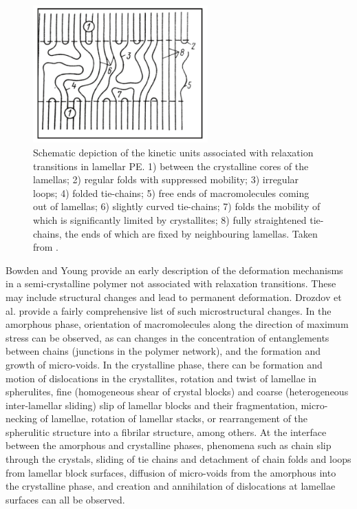 \begin{figure}[hbtp]
	\centering
	\includegraphics[width=0.6\textwidth]{figures/kinetic_units_scp}
	\caption{Schematic depiction of the kinetic units associated with relaxation transitions in lamellar PE. 1) between the crystalline cores of the lamellas; 2) regular folds with suppressed mobility; 3) irregular loops; 4) folded tie-chains; 5) free ends of macromolecules coming out of lamellas; 6) slightly curved tie-chains; 7) folds the mobility of which is significantly limited by crystallites; 8) fully straightened tie-chains, the ends of which are fixed by neighbouring lamellas. Taken from \cite{arzhakovRelaxationPhysicalMechanical2019}.}
\label{fig:kinetic_units_relax_scp}
\end{figure}

Bowden and Young \citep{bowdenDeformationMechanismsCrystalline1974} provide an early description of the deformation mechanisms in a semi-crystalline polymer not associated with relaxation transitions.
These may include structural changes and lead to permanent deformation.
Drozdov et al. \citep{drozdovViscoelasticityViscoplasticityCreep2009} provide a fairly comprehensive list of such microstructural changes.
In the amorphous phase, orientation of macromolecules along the direction of maximum stress can be observed, as can changes in the concentration of entanglements between chains (junctions in the polymer network), and the formation and growth of micro-voids.
In the crystalline phase, there can be formation and motion of dislocations in the crystallites, rotation and twist of lamellae in spherulites, fine (homogeneous shear of crystal blocks) and coarse (heterogeneous inter-lamellar sliding) slip of lamellar blocks and their fragmentation, micro-necking of lamellae, rotation of lamellar stacks, or rearrangement of the spherulitic structure into a fibrilar structure, among others.
At the interface between the amorphous and crystalline phases, phenomena such as chain slip through the crystals, sliding of tie chains and detachment of chain folds and loops from lamellar block surfaces, diffusion of micro-voids from the amorphous into the crystalline phase, and creation and annihilation of dislocations at lamellae surfaces can all be observed.

